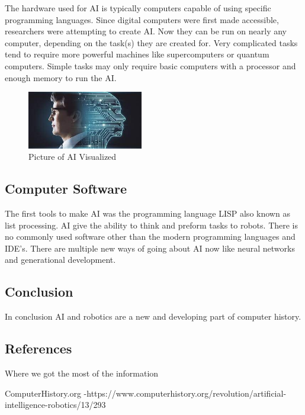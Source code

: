 \documentclass[11pt, twocolumn]{article}
\begin{document}
The hardware used for AI is typically computers capable of using specific programming
languages. Since digital computers were first made accessible, researchers were
attempting to create AI. Now they can be run on nearly any computer, depending on the
task(s) they are created for. Very complicated tasks tend to require more powerful
machines like supercomputers or quantum computers. Simple tasks may only require
basic computers with a processor and enough memory to run the AI.

\begin{figure}
    \centering
    \includegraphics[width=0.45\textwidth]{AI}
    \caption{Picture of AI Visualized}
    \label{fig:AI}
\end{figure}

\subsection{Computer Software}
The first tools to make AI was the programming language LISP also known as list processing. AI give the ability to think and preform tasks to robots. There is no commonly used software other than the modern programming languages and IDE's. There are multiple new ways of going about AI now like neural networks and generational development.

\subsection{Conclusion}
In conclusion AI and robotics are a new and developing part of computer history. 




\subsection{References}
Where we got the most of the information

ComputerHistory.org 
-https://www.computerhistory.org/revolution/artificial-intelligence-robotics/13/293
\end{document}
